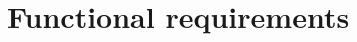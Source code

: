 \documentclass[11pt,a4paper]{article}
\begin{document}
\section*{Functional requirements}


\end{document}
